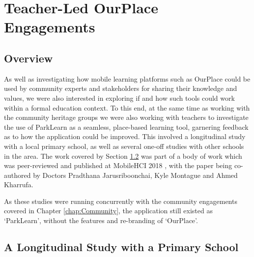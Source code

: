 \chapter{Teacher-Led OurPlace Engagements}
\label{chap:Teachers}

\section{Overview}

As well as investigating how mobile learning platforms such as OurPlace could be used by community experts and stakeholders for sharing their knowledge and values, we were also interested in exploring if and how such tools could work within a formal education context. To this end, at the same time as working with the community heritage groups we were also working with teachers to investigate the use of ParkLearn as a seamless, place-based learning tool, garnering feedback as to how the application could be improved. This involved a longitudinal study with a local primary school, as well as several one-off studies with other schools in the area. The work covered by Section \ref{sec:LongitudinalSchool} was part of a body of work which was peer-reviewed and published at MobileHCI 2018 \citep{Richardson2018}, with the paper being co-authored by Doctors Pradthana Jarusriboonchai, Kyle Montague and Ahmed Kharrufa.

As these studies were running concurrently with the community engagements covered in Chapter \ref{chap:Community}, the application still existed as `ParkLearn', without the features and re-branding of `OurPlace'.

\section{A Longitudinal Study with a Primary School}
\label{sec:LongitudinalSchool}

